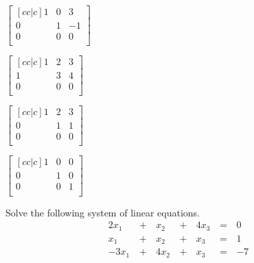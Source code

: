 \documentclass{article}
\begin{document}
\begin{readinessAssuranceTest}
  \begin{multicols}{4}
  \begin{readinessAssuranceTestChoices}
  \item
    \(
      \begin{bmatrix}[cc|c]
        1 & 0 & 3 \\
        0 & 1 & -1 \\
        0 & 0 & 0 \\
      \end{bmatrix}
    \)
  \item
    \(
      \begin{bmatrix}[cc|c]
        1 & 2 & 3 \\
        1 & 3 & 4 \\
        0 & 0 & 0 \\
      \end{bmatrix}
    \)
  \item
    \(
      \begin{bmatrix}[cc|c]
        1 & 2 & 3 \\
        0 & 1 & 1 \\
        0 & 0 & 0 \\
      \end{bmatrix}
    \)
  \item
    \(
      \begin{bmatrix}[cc|c]
        1 & 0 & 0 \\
        0 & 1 & 0 \\
        0 & 0 & 1 \\
      \end{bmatrix}
    \) %
  \end{readinessAssuranceTestChoices}
  \end{multicols}

  \item Solve the following system of linear equations.
  \begin{alignat*}{4}
    2x_1 &\,+\,& x_2 &\,+\,& 4x_3 &\,=\,& 0 \\
     x_1 &\,+\,& x_2 &\,+\,&  x_3 &\,=\,& 1 \\
   -3x_1 &\,+\,& 4x_2 &\,+\,& x_3 &\,=\,& -7 \\
  \end{alignat*}


\end{readinessAssuranceTest}
\end{document}
